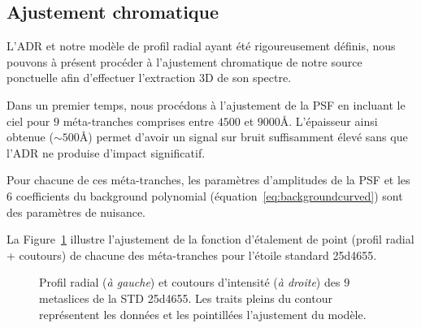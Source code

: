 \documentclass[../main/main.tex]{subfiles}
\begin{document}
\subsection{Ajustement chromatique}\label{ssec:chrom}

L'ADR et notre modèle de profil radial ayant été rigoureusement définis,
nous pouvons à présent procéder à l'ajustement chromatique de notre
source ponctuelle afin d'effectuer l'extraction 3D de son spectre.

Dans un premier temps, nous procédons à l'ajustement de la PSF en
incluant le ciel pour $9$ méta-tranches comprises entre $4500$ et
$9000$\AA. L'épaisseur ainsi obtenue ($\sim500$\AA) permet d'avoir un
signal sur bruit suffisamment élevé sans que l'ADR ne produise d'impact
significatif.

Pour chacune de ces méta-tranches, les paramètres d'amplitudes de la PSF
et les $6$ coefficients du background polynomial (équation~\ref{eq:backgroundcurved}) sont des paramètres de nuisance.

La Figure~\ref{fig:allmetastd} illustre l'ajustement de la fonction
d'étalement de point (profil radial + coutours) de chacune des méta-tranches pour l'étoile
standard 25d4655.

\begin{figure}[ht]
  \centering
  \caption[Profil radial et coutours des $9$ metaslices de la STD
  25d4655]{Profil radial (\textit{à gauche}) et coutours d'intensité
    (\textit{à droite}) des $9$ metaslices de la STD
    25d4655. Les traits pleins du contour représentent les données et
    les pointillées l'ajustement du modèle.}
  \label{fig:allmetastd}
\end{figure}
\end{document}
